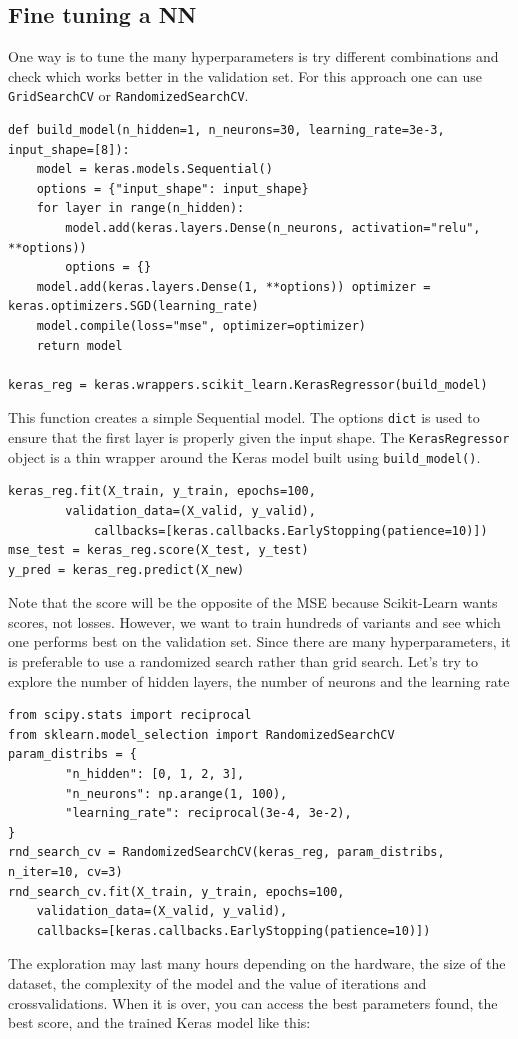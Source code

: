 \documentclass[12pt, letterpaper]{article}
\theoremstyle{definition}
\begin{document}
\subsection{Fine tuning a NN}
One way is to tune the many hyperparameters is try different combinations and check which works better in the validation set. For this approach one can use \lstinline+GridSearchCV+ or \lstinline+RandomizedSearchCV+.
\begin{lstlisting}
def build_model(n_hidden=1, n_neurons=30, learning_rate=3e-3, input_shape=[8]): 
    model = keras.models.Sequential()
    options = {"input_shape": input_shape}
    for layer in range(n_hidden):
        model.add(keras.layers.Dense(n_neurons, activation="relu", **options))
        options = {} 
    model.add(keras.layers.Dense(1, **options)) optimizer = keras.optimizers.SGD(learning_rate)         
    model.compile(loss="mse", optimizer=optimizer) 
    return model
    
keras_reg = keras.wrappers.scikit_learn.KerasRegressor(build_model)
\end{lstlisting}
This function creates a simple Sequential model. The options \lstinline+dict+ is used to ensure that the first layer is properly given the input shape. The \lstinline+KerasRegressor+ object is a thin wrapper around the Keras model built using \lstinline+build_model()+.

\begin{lstlisting}
keras_reg.fit(X_train, y_train, epochs=100,
		validation_data=(X_valid, y_valid),
    		callbacks=[keras.callbacks.EarlyStopping(patience=10)])
mse_test = keras_reg.score(X_test, y_test)
y_pred = keras_reg.predict(X_new)
\end{lstlisting}

Note that the score will be the opposite of the MSE because Scikit-Learn wants scores, not losses. However, we want to train hundreds of variants and see which one performs best on the validation set. Since there are many hyperparameters, it is preferable to use a randomized search rather than grid search.
Let's try to explore the number of hidden layers, the number of neurons and the learning rate

\begin{lstlisting}
from scipy.stats import reciprocal
from sklearn.model_selection import RandomizedSearchCV
param_distribs = {
        "n_hidden": [0, 1, 2, 3],
        "n_neurons": np.arange(1, 100),
        "learning_rate": reciprocal(3e-4, 3e-2),
}
rnd_search_cv = RandomizedSearchCV(keras_reg, param_distribs, n_iter=10, cv=3)
rnd_search_cv.fit(X_train, y_train, epochs=100,
    validation_data=(X_valid, y_valid),
    callbacks=[keras.callbacks.EarlyStopping(patience=10)])
\end{lstlisting}
The exploration may last many hours depending on the hardware, the size of the dataset, the complexity of the model and the value of iterations and crossvalidations. When it is over, you can access the best parameters found, the best score, and the trained Keras model like this:
\end{document}
